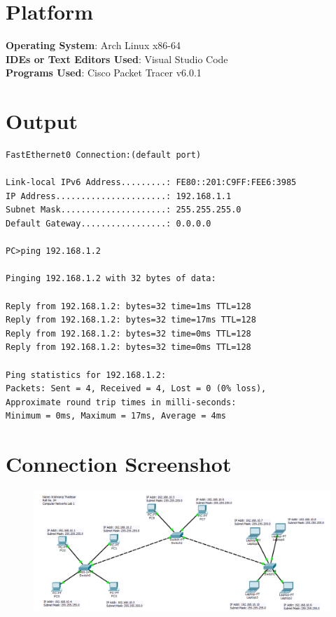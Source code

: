 \documentclass[11pt]{article}
\begin{document}
\section{Platform}
	\textbf{Operating System}: Arch Linux x86-64\\
	\textbf{IDEs or Text Editors Used}: Visual Studio Code\\
	\textbf{Programs Used}: Cisco Packet Tracer v6.0.1

\section{Output}

\begin{lstlisting}
FastEthernet0 Connection:(default port)

Link-local IPv6 Address.........: FE80::201:C9FF:FEE6:3985
IP Address......................: 192.168.1.1
Subnet Mask.....................: 255.255.255.0
Default Gateway.................: 0.0.0.0

PC>ping 192.168.1.2

Pinging 192.168.1.2 with 32 bytes of data:

Reply from 192.168.1.2: bytes=32 time=1ms TTL=128
Reply from 192.168.1.2: bytes=32 time=17ms TTL=128
Reply from 192.168.1.2: bytes=32 time=0ms TTL=128
Reply from 192.168.1.2: bytes=32 time=0ms TTL=128

Ping statistics for 192.168.1.2:
Packets: Sent = 4, Received = 4, Lost = 0 (0% loss),
Approximate round trip times in milli-seconds:
Minimum = 0ms, Maximum = 17ms, Average = 4ms

\end{lstlisting}

\section{Connection Screenshot}


\begin{figure}[H]
	\centering
	\includegraphics[scale=0.47]{Screenshots/Assignment_1_screenshot.png}
\end{figure}
\end{document}
